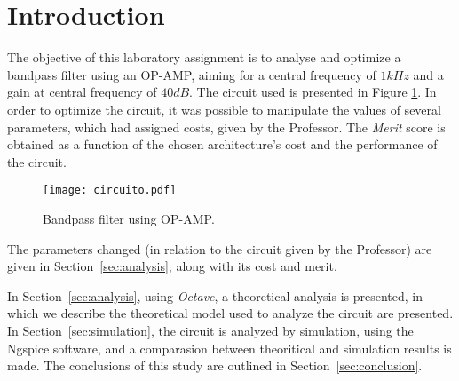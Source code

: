 \section{Introduction}
\label{sec:introduction}

The objective of this laboratory assignment is to analyse and optimize a bandpass filter using an OP-AMP, aiming for a central frequency of $1kHz$ and a gain at central frequency of $40dB$. The circuit used is presented in Figure  \ref{fig:circuit}. In order to optimize the circuit, it was possible to manipulate the values of several parameters, which had assigned costs, given by the Professor. The \textit{Merit} score is obtained as a function of the chosen architecture's cost and the performance of the circuit.


\begin{figure}[h] \centering
\texttt{[image: circuito.pdf]}
\caption{Bandpass filter using OP-AMP.}
\label{fig:circuit}
\end{figure}

The parameters changed (in relation to the circuit given by the Professor) are given in Section~\ref{sec:analysis}, along with its cost and merit.


In Section~\ref{sec:analysis}, using \textit{Octave}, a theoretical analysis is presented, in which we describe the theoretical model used to analyze the circuit are presented. In Section~\ref{sec:simulation}, the circuit is analyzed by simulation, using the Ngspice software, and a comparasion between theoritical and simulation results is made. The conclusions of this study are outlined in Section~\ref{sec:conclusion}.